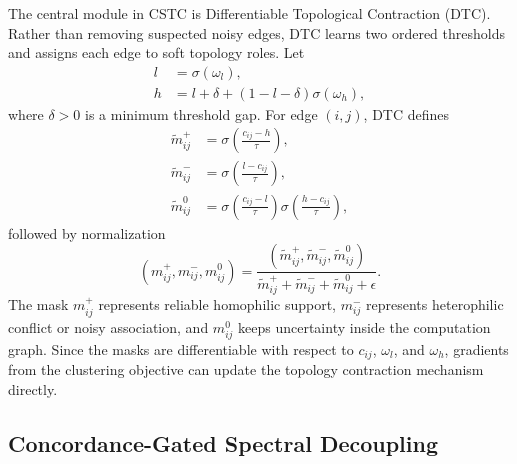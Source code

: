 The central module in CSTC is Differentiable Topological Contraction (DTC). Rather than removing suspected noisy edges, DTC learns two ordered thresholds and assigns each edge to soft topology roles. Let
\begin{align}
  l &= \sigma(\omega_l), \\
  h &= l + \delta + (1-l-\delta)\sigma(\omega_h),
\end{align}
where $\delta>0$ is a minimum threshold gap. For edge $(i,j)$, DTC defines
\begin{align}
  \tilde{m}^{+}_{ij} &= \sigma\!\left(\frac{c_{ij}-h}{\tau}\right), \\
  \tilde{m}^{-}_{ij} &= \sigma\!\left(\frac{l-c_{ij}}{\tau}\right), \\
  \tilde{m}^{0}_{ij} &= \sigma\!\left(\frac{c_{ij}-l}{\tau}\right)
                       \sigma\!\left(\frac{h-c_{ij}}{\tau}\right),
\end{align}
followed by normalization
\begin{equation}
  (m^{+}_{ij},m^{-}_{ij},m^{0}_{ij})
  =
  \frac{(\tilde{m}^{+}_{ij},\tilde{m}^{-}_{ij},\tilde{m}^{0}_{ij})}
  {\tilde{m}^{+}_{ij}+\tilde{m}^{-}_{ij}+\tilde{m}^{0}_{ij}+\epsilon}.
\end{equation}
The mask $m^{+}_{ij}$ represents reliable homophilic support, $m^{-}_{ij}$ represents heterophilic conflict or noisy association, and $m^{0}_{ij}$ keeps uncertainty inside the computation graph. Since the masks are differentiable with respect to $c_{ij}$, $\omega_l$, and $\omega_h$, gradients from the clustering objective can update the topology contraction mechanism directly.

\subsection{Concordance-Gated Spectral Decoupling}
\label{subsec:spectral-decoupling}

